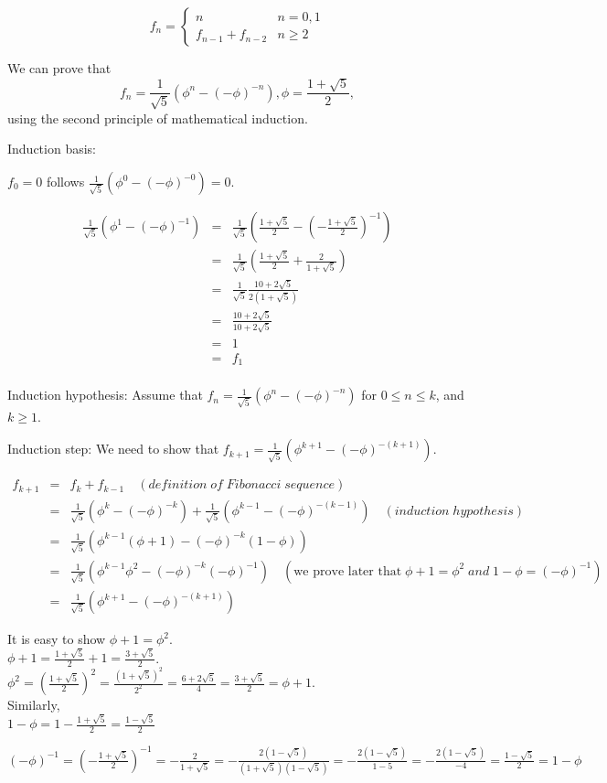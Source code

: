 \documentclass {article}
\begin{document}
\[
  f_n = \left\{ 
  \begin{array}{ll}
    n & n =0,1 \\
   f_{n-1} + f_{n-2} & n \ge 2
   \end{array}
\right.
\]

We can prove that
$$ f_n = \frac{1}{\sqrt{5}}{(\phi^n - (-\phi)^{-n})}, \phi =
\frac{1+\sqrt{5}}{2}, $$ 
using the second principle of mathematical induction.

Induction basis:

$f_0 = 0$ follows $\frac{1}{\sqrt{5}}{(\phi^0 - (-\phi)^{-0})} = 0$.

\begin{eqnarray*}
\frac{1}{\sqrt{5}}(\phi^1 - (-\phi)^{-1}) 
&=& \frac{1}{\sqrt{5}}(\frac{1+\sqrt{5}}{2} -(-\frac{1+\sqrt{5}}{2})^{-1})\\
&=& \frac{1}{\sqrt{5}}(\frac{1+\sqrt{5}}{2} + \frac{2}{1+\sqrt{5}})\\
&=& \frac{1}{\sqrt{5}}\frac{10+2\sqrt{5}}{2(1+\sqrt{5})}\\
&=& \frac{10+2\sqrt{5}}{10+2\sqrt{5}} \\
&=& 1 \\
&=& f_1 \\
\end{eqnarray*}

Induction hypothesis:
Assume that $ f_n = \frac{1}{\sqrt{5}}{(\phi^n - (-\phi)^{-n})}$ for $0 \le
n \le k$, and $k \ge 1$.

Induction step: We need to show that  $ f_{k+1} =
\frac{1}{\sqrt{5}}(\phi^{k+1} - (-\phi)^{-(k+1)})$.

\begin{eqnarray*}
f_{k+1} &=& f_k + f_{k-1} \quad (definition \; of \; Fibonacci \; sequence)\\
&=&  \frac{1}{\sqrt{5}}{(\phi^k - (-\phi)^{-k})} +
\frac{1}{\sqrt{5}}{(\phi^{k-1} - (-\phi)^{-(k-1)})} \quad (induction \; hypothesis)\\
&=& \frac{1}{\sqrt{5}}(\phi^{k-1}(\phi+1) - (-\phi)^{-k}(1-\phi)) \\
&=& \frac{1}{\sqrt{5}}(\phi^{k-1} \phi^2 -  (-\phi)^{-k}(-\phi)^{-1}) \quad
  (\mbox {we prove later that} \; \phi+1 = \phi^2 \; and \; 1-\phi = (-\phi)^{-1})\\
&=& \frac{1}{\sqrt{5}}(\phi^{k+1} - (-\phi)^{-(k+1)})
\end{eqnarray*}


It is easy to show $\phi+1 = \phi^2$.\\
$\phi+1 = \frac{1 + \sqrt{5}}{2} + 1 = \frac{3 + \sqrt{5}}{2}$. \\
$\phi^2 = (\frac{1 + \sqrt{5}}{2})^2 = \frac{(1+\sqrt{5})^2}{2^2} =
\frac{6+2\sqrt{5}}{4} = \frac{3 + \sqrt{5}}{2} = \phi+1 $. \\

Similarly, \\
$1-\phi = 1 - \frac{1 + \sqrt{5}}{2} = \frac{1 - \sqrt{5}}{2}$ 

$(-\phi)^{-1} 
= (-\frac{1 + \sqrt{5}}{2})^{-1} 
= - \frac{2}{1 + \sqrt{5}}
= - \frac{2(1-\sqrt{5})}{(1 + \sqrt{5})(1 - \sqrt{5})}
= - \frac{2(1-\sqrt{5})}{1-5}
= - \frac{2(1-\sqrt{5})}{-4}
= \frac{1-\sqrt{5}}{2} 
= 1-\phi$ \\
\end{document}
